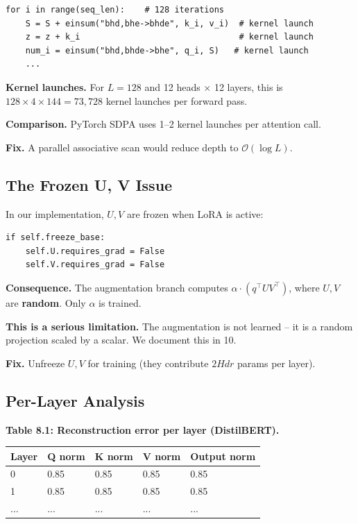 \begin{lstlisting}
for i in range(seq_len):    # 128 iterations
    S = S + einsum("bhd,bhe->bhde", k_i, v_i)  # kernel launch
    z = z + k_i                                # kernel launch
    num_i = einsum("bhd,bhde->bhe", q_i, S)   # kernel launch
    ...
\end{lstlisting}

\textbf{Kernel launches.} For $L = 128$ and 12 heads $\times$ 12 layers, this is 
$128 \times 4 \times 144 = 73{,}728$ kernel launches per forward pass.

\textbf{Comparison.} PyTorch SDPA uses 1--2 kernel launches per attention call.

\textbf{Fix.} A parallel associative scan would reduce depth to $\mathcal{O}(\log L)$.

\subsection{The Frozen U, V Issue}

In our implementation, $U, V$ are frozen when LoRA is active:

\begin{lstlisting}
if self.freeze_base:
    self.U.requires_grad = False
    self.V.requires_grad = False
\end{lstlisting}

\textbf{Consequence.} The augmentation branch computes 
$\alpha \cdot (q^\top U V^\top)$, where $U, V$ are \textbf{random}. Only 
$\alpha$ is trained.

\textbf{This is a serious limitation.} The augmentation is not learned -- it is 
a random projection scaled by a scalar. We document this in  10.

\textbf{Fix.} Unfreeze $U, V$ for training (they contribute $2 H d r$ params 
per layer).

\subsection{Per-Layer Analysis}

\textbf{Table 8.1: Reconstruction error per layer (DistilBERT).}

\begin{table}[H]
\centering
\small
\begin{tabular}{lllll}
\toprule
\textbf{Layer} & \textbf{Q norm} & \textbf{K norm} & \textbf{V norm} & \textbf{Output norm} \\
\midrule
0 & 0.85 & 0.85 & 0.85 & 0.85 \\
1 & 0.85 & 0.85 & 0.85 & 0.85 \\
... & ... & ... & ... & ... \\
\bottomrule
\end{tabular}
\end{table}

